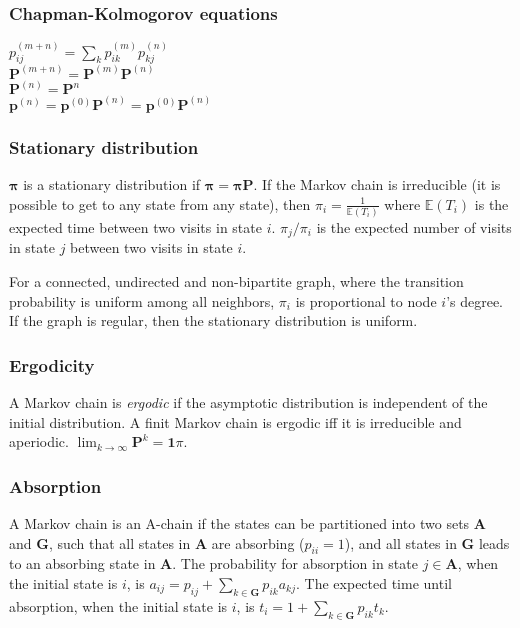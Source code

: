 \vspace{5mm} %
\subsubsection{Chapman-Kolmogorov equations}
$p_{ij}^{(m+n)}=\sum_k p_{ik}^{(m)}p_{kj}^{(n)}$\\
$\mathbf{P}^{(m+n)} = \mathbf{P}^{(m)}\mathbf{P}^{(n)}$\\
$\mathbf{P}^{(n)} = \mathbf{P}^n$\\
$\mathbf{p}^{(n)} = \mathbf{p}^{(0)}\mathbf{P}^{(n)} = \mathbf{p}^{(0)}\mathbf{P}^{(n)}$

\vspace{5mm} %
\subsubsection{Stationary distribution}
$\mathbf{\pi}$ is a stationary distribution if $\mathbf{\pi} = \mathbf{\pi P}$. If the Markov chain is irreducible (it is possible to get to any state from any state), then $\pi_i = \frac{1}{\mathbb{E}(T_i)}$ where $\mathbb{E}(T_i)$  is the expected time between two visits in state $i$. $\pi_j/\pi_i$ is the expected number of visits in state $j$ between two visits in state $i$.

For a connected, undirected and non-bipartite graph, where the transition probability is uniform among all neighbors, $\pi_i$ is proportional to node $i$'s degree. If the graph is regular, then the stationary distribution is uniform.

\vspace{5mm} %
\subsubsection{Ergodicity}
A Markov chain is \emph{ergodic} if the asymptotic distribution is independent of the initial distribution. A finit Markov chain is ergodic iff it is irreducible and aperiodic. $\lim_{k\rightarrow\infty}\mathbf{P}^k = \mathbf{1}\pi$.

\subsubsection{Absorption}
A Markov chain is an A-chain if the states can be partitioned into two sets $\mathbf{A}$ and $\mathbf{G}$, such that all states in $\mathbf{A}$ are absorbing ($p_{ii}=1$), and all states in $\mathbf{G}$ leads to an absorbing state in $\mathbf{A}$. The probability for absorption in state $j\in\mathbf{A}$, when the initial state is $i$, is $a_{ij} = p_{ij}+\sum_{k\in\mathbf{G}} p_{ik}a_{kj}$. The expected time until absorption, when the initial state is $i$, is $t_i = 1+\sum_{k\in\mathbf{G}}p_{ik}t_k$.
